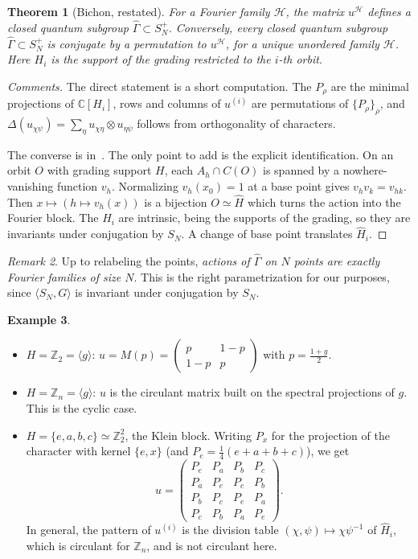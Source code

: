\documentclass[11pt]{amsart}
\newtheorem{theorem}{Theorem}[section]
\theoremstyle{definition}
\newtheorem{example}[theorem]{Example}
\theoremstyle{remark}
\newtheorem{remark}[theorem]{Remark}
\theoremstyle{plain}
\numberwithin{equation}{section}
\numberwithin{table}{section}
\newcommand{\C}{\mathbb C}
\newcommand{\Z}{\mathbb Z}
\begin{document}
\begin{theorem}[Bichon, restated]\label{thm:bichon}
For a Fourier family $\mathcal H$, the matrix $u^{\mathcal H}$ defines a closed quantum subgroup $\widehat\Gamma\subset S_N^+$. Conversely, every closed quantum subgroup $\widehat\Gamma\subset S_N^+$ is conjugate by a permutation to $u^{\mathcal H}$, for a unique unordered family $\mathcal H$. Here $H_i$ is the support of the grading restricted to the $i$-th orbit.
\end{theorem}

\begin{proof}[Comments]
The direct statement is a short computation. The $P_\rho$ are the minimal projections of $\C[H_i]$, rows and columns of $u^{(i)}$ are permutations of $\{P_\rho\}_\rho$, and $\Delta(u_{\chi\psi})=\sum_\eta u_{\chi\eta}\otimes u_{\eta\psi}$ follows from orthogonality of characters.

The converse is in~\cite{bi}. The only point to add is the explicit identification. On an orbit $O$ with grading support $H$, each $A_h\cap C(O)$ is spanned by a nowhere-vanishing function $v_h$. Normalizing $v_h(x_0)=1$ at a base point gives $v_hv_k=v_{hk}$. Then $x\mapsto(h\mapsto v_h(x))$ is a bijection $O\simeq\widehat H$ which turns the action into the Fourier block. The $H_i$ are intrinsic, being the supports of the grading, so they are invariants under conjugation by $S_N$. A change of base point translates $\widehat H_i$.
\end{proof}

\begin{remark}
Up to relabeling the points, \emph{actions of $\widehat\Gamma$ on $N$ points are exactly Fourier families of size $N$}. This is the right parametrization for our purposes, since $\langle S_N,G\rangle$ is invariant under conjugation by $S_N$.
\end{remark}

\begin{example}\label{ex:blocks}
\begin{itemize}
\item $H=\Z_2=\langle g\rangle$: $u=M(p)=\begin{pmatrix}p&1-p\\1-p&p\end{pmatrix}$ with $p=\frac{1+g}2$.
\item $H=\Z_n=\langle g\rangle$: $u$ is the circulant matrix built on the spectral projections of $g$. This is the cyclic case.
\item $H=\{e,a,b,c\}\simeq\Z_2^2$, the Klein block. Writing $P_x$ for the projection of the character with kernel $\{e,x\}$ (and $P_e=\frac14(e+a+b+c)$), we get
\[
u=\begin{pmatrix}P_e&P_a&P_b&P_c\\P_a&P_e&P_c&P_b\\P_b&P_c&P_e&P_a\\P_c&P_b&P_a&P_e\end{pmatrix}.
\]
In general, the pattern of $u^{(i)}$ is the division table $(\chi,\psi)\mapsto\chi\psi^{-1}$ of $\widehat H_i$, which is circulant for $\Z_n$, and is not circulant here.
\end{itemize}
\end{example}
\end{document}
